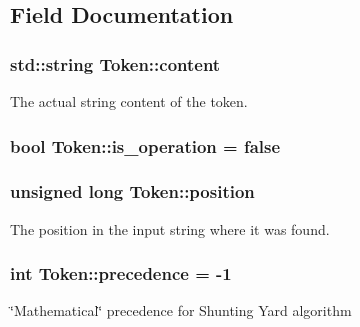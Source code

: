 \subsection{Field Documentation}
\subsubsection[{\texorpdfstring{content}{content}}]{\setlength{\rightskip}{0pt plus 5cm}std\+::string Token\+::content}\hypertarget{structToken_a0e29f6b35c314683c1a4729eb0d08739}{}\label{structToken_a0e29f6b35c314683c1a4729eb0d08739}


The actual string content of the token. 

\subsubsection[{\texorpdfstring{is\+\_\+operation}{is_operation}}]{\setlength{\rightskip}{0pt plus 5cm}bool Token\+::is\+\_\+operation = false}\hypertarget{structToken_a45a4e04f11c31ab263bd5be4546f6fc1}{}\label{structToken_a45a4e04f11c31ab263bd5be4546f6fc1}
\subsubsection[{\texorpdfstring{position}{position}}]{\setlength{\rightskip}{0pt plus 5cm}unsigned long Token\+::position}\hypertarget{structToken_ab8ddfabb4f48684b2ff8620948e12fcc}{}\label{structToken_ab8ddfabb4f48684b2ff8620948e12fcc}


The position in the input string where it was found. 

\subsubsection[{\texorpdfstring{precedence}{precedence}}]{\setlength{\rightskip}{0pt plus 5cm}int Token\+::precedence = -\/1}\hypertarget{structToken_adafb834c6a6e9e4ce4b0bf709f0b2bac}{}\label{structToken_adafb834c6a6e9e4ce4b0bf709f0b2bac}


\char`\"{}\+Mathematical\char`\"{} precedence for Shunting Yard algorithm 

